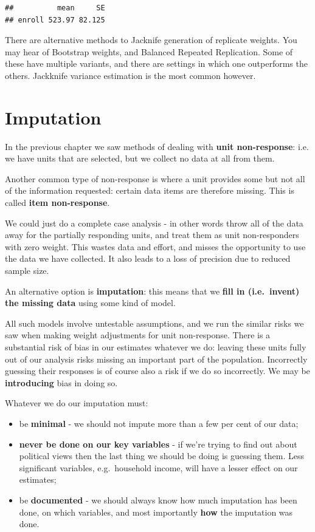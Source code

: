 \documentclass[
]{book}
\providecommand{\tightlist}{%
  \setlength{\itemsep}{0pt}\setlength{\parskip}{0pt}}
\begin{document}
\begin{verbatim}
##          mean     SE
## enroll 523.97 82.125
\end{verbatim}

There are alternative methods to Jacknife generation of replicate weights.
You may hear of Bootstrap weights, and Balanced Repeated Replication. Some
of these have multiple variants, and there are settings in which one outperforms
the others. Jackknife variance estimation is the most common however.

\chapter{Imputation}\label{imputation}

In the previous chapter we saw methods of dealing with \textbf{unit non-response}: i.e.
we have units that are selected, but we collect no data at all from them.

Another common type of non-response is where a unit provides some but not all of the
information requested: certain data items are therefore missing. This is called
\textbf{item non-response}.

We could just do a complete case analysis - in other words throw all of the data away for
the partially responding units, and treat them as unit non-responders with zero weight. This wastes data and effort,
and misses the opportunity to use the data we have collected. It also leads to
a loss of precision due to reduced sample size.

An alternative option is \textbf{imputation}: this means that we \textbf{fill in (i.e.~invent)
the missing data} using some kind of model.

All such models involve untestable assumptions, and we run the similar risks we
saw when making weight adjustments for unit non-response. There is a substantial risk of bias
in our estimates whatever we do: leaving these units fully out of our analysis
risks missing an important part of the population. Incorrectly guessing their responses
is of course also a risk if we do so incorrectly. We may be \textbf{introducing} bias
in doing so.

Whatever we do our imputation must:

\begin{itemize}
\tightlist
\item
  be \textbf{minimal} - we should not impute more than a few per cent of our data;
\item
  \textbf{never be done on our key variables} - if we're trying to find out about political
  views then the last thing we should be doing is guessing them. Less significant
  variables, e.g.~household income, will have a lesser effect on our estimates;
\item
  be \textbf{documented} - we should always know how much imputation has been done,
  on which variables, and most importantly \textbf{how} the imputation was done.
\end{itemize}
\end{document}
